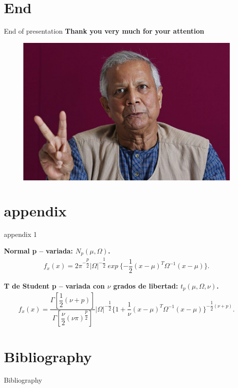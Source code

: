 \documentclass[10pt]{beamer}
\begin{document}
\section{End}
\begin{frame}[c]{End of presentation}
\centering
\textbf{Thank you very much for your attention}

\begin{figure}[H]
\centering
\includegraphics[scale=0.2]{figuras/yunus-final}
\label{figuraf}
\end{figure}

\end{frame}

\section{appendix}
	\begin{frame}{appendix 1}
	\justifying
{\small
\textbf{Normal p – variada: $N_p (\mu,\Omega)$.}
\begin{align}
f_x(x)= 2\pi^{-\dfrac{p}{2}}\vert\Omega\vert^{-\dfrac{1}{2}} \ exp \ \lbrace-\dfrac{1}{2}(x-\mu)^{T}\Omega^{-1}(x-\mu)\rbrace.
\end{align}

\textbf{T de Student p – variada con $\nu$ grados de libertad: $t_p(\mu,\Omega,\nu)$.}
\begin{align}
f_x(x)= \dfrac{\Gamma[\dfrac{1}{2}(\nu+p)]}{\Gamma[\dfrac{\nu}{2}(\nu\pi)^{\dfrac{p}{2}}]}\vert\Omega\vert^{-\dfrac{1}{2}}\lbrace1+\dfrac{1}{\nu}(x-\mu)^{T}\Omega^{-1}(x-\mu)\rbrace^{-\dfrac{1}{2}(\nu+p)}.
\end{align}
\begin{flushright}
\cite{leal2023}
\end{flushright}}
\end{frame}

\section{Bibliography}
	\begin{frame}[allowframebreaks]{Bibliography}
	
		
	\end{frame}
\end{document}
